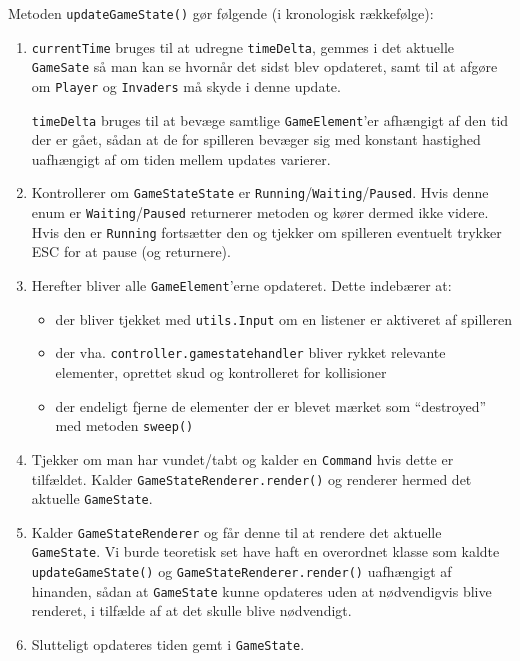 \documentclass[titlepage,danish]{article}
\newcommand{\code}[1]{\texttt{#1}}
\begin{document}
Metoden \code{updateGameState()} gør følgende (i kronologisk rækkefølge):
\begin{enumerate}

\item \code{currentTime} bruges til at udregne \code{timeDelta}, gemmes i det aktuelle
  \code{GameSate} så man kan se hvornår det sidst blev opdateret, samt til at afgøre om
  \code{Player} og \code{Invaders} må skyde i denne update.

\code{timeDelta} bruges til at bevæge samtlige \code{GameElement}’er afhængigt af den tid der er
gået, sådan at de for spilleren bevæger sig med konstant hastighed uafhængigt af om tiden mellem
updates varierer.

\item Kontrollerer om \code{GameStateState} er \code{Running}/\code{Waiting}/\code{Paused}. Hvis
denne enum er \code{Waiting}/\code{Paused} returnerer metoden og kører dermed ikke videre. Hvis den
er \code{Running} fortsætter den og tjekker om spilleren eventuelt trykker ESC for at pause (og returnere).

\item Herefter bliver alle \code{GameElement}’erne opdateret. Dette indebærer at:
\begin{itemize}
\item der bliver tjekket med \code{utils.Input} om en listener er aktiveret af spilleren
\item der vha. \code{controller.gamestatehandler} bliver rykket relevante elementer, oprettet skud og kontrolleret for kollisioner
\item der endeligt fjerne de elementer der er blevet mærket som ``destroyed'' med metoden \code{sweep()}
\end{itemize}


\item Tjekker om man har vundet/tabt og kalder en \code{Command} hvis dette er tilfældet. Kalder
\code{GameStateRenderer.render()} og renderer hermed det aktuelle \code{GameState}.

\item Kalder \code{GameStateRenderer} og får denne til at rendere det aktuelle \code{GameState}. Vi
burde teoretisk set have haft en overordnet klasse som kaldte \code{updateGameState()} og
\code{GameStateRenderer.render()} uafhængigt af hinanden, sådan at \code{GameState} kunne opdateres
uden at nødvendigvis blive renderet, i tilfælde af at det skulle blive nødvendigt.

\item Slutteligt opdateres tiden gemt i \code{GameState}.
\end{enumerate}
\end{document}
